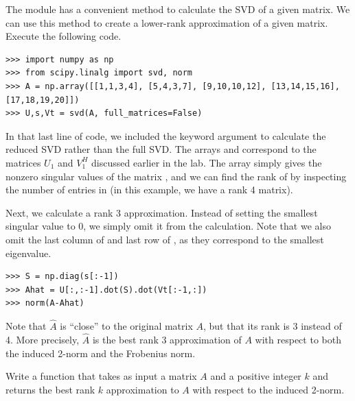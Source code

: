 The  module has a convenient method to calculate the SVD of a given matrix. We can use
this method to create a lower-rank approximation of a given matrix. Execute the following code.
\begin{lstlisting}
>>> import numpy as np
>>> from scipy.linalg import svd, norm
>>> A = np.array([[1,1,3,4], [5,4,3,7], [9,10,10,12], [13,14,15,16], [17,18,19,20]])
>>> U,s,Vt = svd(A, full_matrices=False)
\end{lstlisting}
In that last line of code, we included the keyword argument  to calculate the
reduced SVD rather than the full SVD. The arrays  and  correspond to the matrices
$U_1$ and $V_1^H$ discussed earlier in the lab. The array  simply gives the nonzero singular values
of the matrix , and we can find the rank of  by inspecting the number of entries in  (in this
example, we have a rank 4 matrix). 

Next, we calculate a rank 3 approximation. Instead of setting the smallest singular value to 0, we simply
omit it from the calculation. Note that we also omit the last column of  and last row of , as
they correspond to the smallest eigenvalue. 
\begin{lstlisting}
>>> S = np.diag(s[:-1])
>>> Ahat = U[:,:-1].dot(S).dot(Vt[:-1,:])
>>> norm(A-Ahat)
\end{lstlisting}
Note that $\widehat A$ is ``close'' to the original matrix $A$, but that its rank is 3 instead of 4. More
precisely, $\widehat A$ is the best rank 3 approximation of $A$ with respect to both the induced 2-norm and
the Frobenius norm. 

\begin{problem}
Write a function  that takes as input a matrix $A$ and a positive integer $k$ and returns 
the best rank $k$ approximation to $A$ with respect to the induced 2-norm.
\end{problem}

